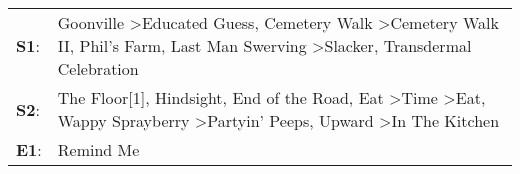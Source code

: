 \begin{supertabular}{p{0.03\textwidth}p{0.92\textwidth}}
 \textbf{S1}:  &                                                          Goonville\textsuperscript{} \textgreater \enspace Educated Guess\textsuperscript{}, \enspace Cemetery Walk\textsuperscript{} \textgreater \enspace Cemetery Walk II\textsuperscript{}, \enspace Phil's Farm\textsuperscript{}, \enspace Last Man Swerving\textsuperscript{} \textgreater \enspace Slacker\textsuperscript{}, \enspace Transdermal Celebration\textsuperscript{}  \enspace  \\
 \textbf{S2}:  &  The Floor[1]\textsuperscript{}, \enspace Hindsight\textsuperscript{}, \enspace End of the Road\textsuperscript{}, \enspace Eat\textsuperscript{} \textgreater \enspace Time\textsuperscript{} \textgreater \enspace Eat\textsuperscript{}, \enspace Wappy Sprayberry\textsuperscript{} \textgreater \enspace Partyin' Peeps\textsuperscript{}, \enspace Upward\textsuperscript{} \textgreater \enspace In The Kitchen\textsuperscript{}  \enspace  \\
 \textbf{E1}:  &                                                                                                                                                                                                                                                                                                                                                                                                              Remind Me\textsuperscript{}  \enspace  \\
\end{supertabular}
